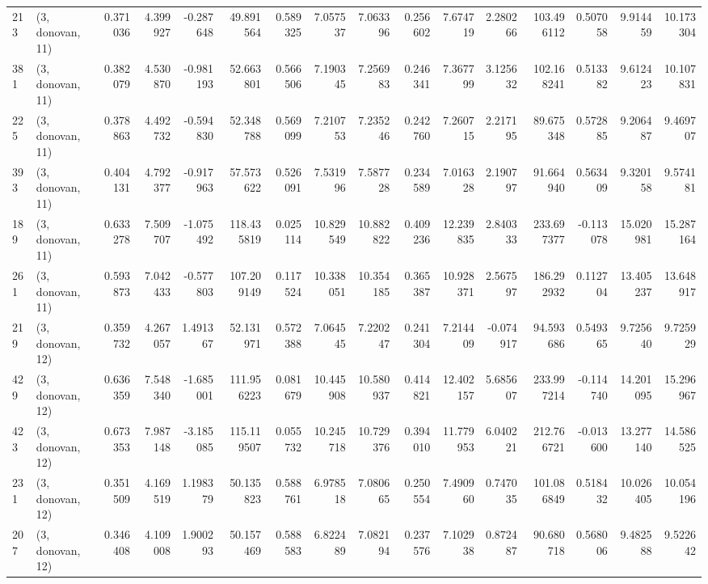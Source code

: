 \begin{tabular}{llrrrrrrrrrrrrrr}
213 &  (3, donovan, 11) &   0.371036 &   4.399927 &  -0.287648 &    49.891564 &   0.589325 &   7.057537 &   7.063396 &  0.256602 &   7.674719 &   2.280266 &   103.496112 &  0.507058 &   9.914459 &  10.173304 \\
381 &  (3, donovan, 11) &   0.382079 &   4.530870 &  -0.981193 &    52.663801 &   0.566506 &   7.190345 &   7.256983 &  0.246341 &   7.367799 &   3.125632 &   102.168241 &  0.513382 &   9.612423 &  10.107831 \\
225 &  (3, donovan, 11) &   0.378863 &   4.492732 &  -0.594830 &    52.348788 &   0.569099 &   7.210753 &   7.235246 &  0.242760 &   7.260715 &   2.217195 &    89.675348 &  0.572885 &   9.206487 &   9.469707 \\
393 &  (3, donovan, 11) &   0.404131 &   4.792377 &  -0.917963 &    57.573622 &   0.526091 &   7.531996 &   7.587728 &  0.234589 &   7.016328 &   2.190797 &    91.664940 &  0.563409 &   9.320158 &   9.574181 \\
189 &  (3, donovan, 11) &   0.633278 &   7.509707 &  -1.075492 &   118.435819 &   0.025114 &  10.829549 &  10.882822 &  0.409236 &  12.239835 &   2.840333 &   233.697377 & -0.113078 &  15.020981 &  15.287164 \\
261 &  (3, donovan, 11) &   0.593873 &   7.042433 &  -0.577803 &   107.209149 &   0.117524 &  10.338051 &  10.354185 &  0.365387 &  10.928371 &   2.567597 &   186.292932 &  0.112704 &  13.405237 &  13.648917 \\
219 &  (3, donovan, 12) &   0.359732 &   4.267057 &   1.491367 &    52.131971 &   0.572388 &   7.064545 &   7.220247 &  0.241304 &   7.214409 &  -0.074917 &    94.593686 &  0.549365 &   9.725640 &   9.725929 \\
429 &  (3, donovan, 12) &   0.636359 &   7.548340 &  -1.685001 &   111.956223 &   0.081679 &  10.445908 &  10.580937 &  0.414821 &  12.402157 &   5.685607 &   233.997214 & -0.114740 &  14.201095 &  15.296967 \\
423 &  (3, donovan, 12) &   0.673353 &   7.987148 &  -3.185085 &   115.119507 &   0.055732 &  10.245718 &  10.729376 &  0.394010 &  11.779953 &   6.040221 &   212.766721 & -0.013600 &  13.277140 &  14.586525 \\
231 &  (3, donovan, 12) &   0.351509 &   4.169519 &   1.198379 &    50.135823 &   0.588761 &   6.978518 &   7.080665 &  0.250554 &   7.490960 &   0.747035 &   101.086849 &  0.518432 &  10.026405 &  10.054196 \\
207 &  (3, donovan, 12) &   0.346408 &   4.109008 &   1.900293 &    50.157469 &   0.588583 &   6.822489 &   7.082194 &  0.237576 &   7.102938 &   0.872487 &    90.680718 &  0.568006 &   9.482588 &   9.522642 \\

\end{tabular}
